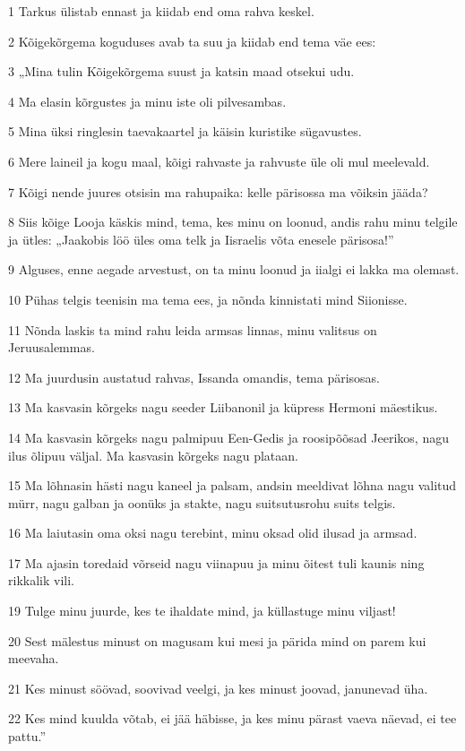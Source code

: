 \par 1 Tarkus ülistab ennast ja kiidab end oma rahva keskel.
\par 2 Kõigekõrgema koguduses avab ta suu ja kiidab end tema väe ees:
\par 3 „Mina tulin Kõigekõrgema suust ja katsin maad otsekui udu.
\par 4 Ma elasin kõrgustes ja minu iste oli pilvesambas.
\par 5 Mina üksi ringlesin taevakaartel ja käisin kuristike sügavustes.
\par 6 Mere laineil ja kogu maal, kõigi rahvaste ja rahvuste üle oli mul meelevald.
\par 7 Kõigi nende juures otsisin ma rahupaika: kelle pärisossa ma võiksin jääda?
\par 8 Siis kõige Looja käskis mind, tema, kes minu on loonud, andis rahu minu telgile ja ütles: „Jaakobis löö üles oma telk ja Iisraelis võta enesele pärisosa!”
\par 9 Alguses, enne aegade arvestust, on ta minu loonud ja iialgi ei lakka ma olemast.
\par 10 Pühas telgis teenisin ma tema ees, ja nõnda kinnistati mind Siionisse.
\par 11 Nõnda laskis ta mind rahu leida armsas linnas, minu valitsus on Jeruusalemmas.
\par 12 Ma juurdusin austatud rahvas, Issanda omandis, tema pärisosas.
\par 13 Ma kasvasin kõrgeks nagu seeder Liibanonil ja küpress Hermoni mäestikus.
\par 14 Ma kasvasin kõrgeks nagu palmipuu Een-Gedis ja roosipõõsad Jeerikos, nagu ilus õlipuu väljal. Ma kasvasin kõrgeks nagu plataan.
\par 15 Ma lõhnasin hästi nagu kaneel ja palsam, andsin meeldivat lõhna nagu valitud mürr, nagu galban ja oonüks ja stakte, nagu suitsutusrohu suits telgis.
\par 16 Ma laiutasin oma oksi nagu terebint, minu oksad olid ilusad ja armsad.
\par 17 Ma ajasin toredaid võrseid nagu viinapuu ja minu õitest tuli kaunis ning rikkalik vili.
\par 19 Tulge minu juurde, kes te ihaldate mind, ja küllastuge minu viljast!
\par 20 Sest mälestus minust on magusam kui mesi ja pärida mind on parem kui meevaha.
\par 21 Kes minust söövad, soovivad veelgi, ja kes minust joovad, janunevad üha.
\par 22 Kes mind kuulda võtab, ei jää häbisse, ja kes minu pärast vaeva näevad, ei tee pattu.”

